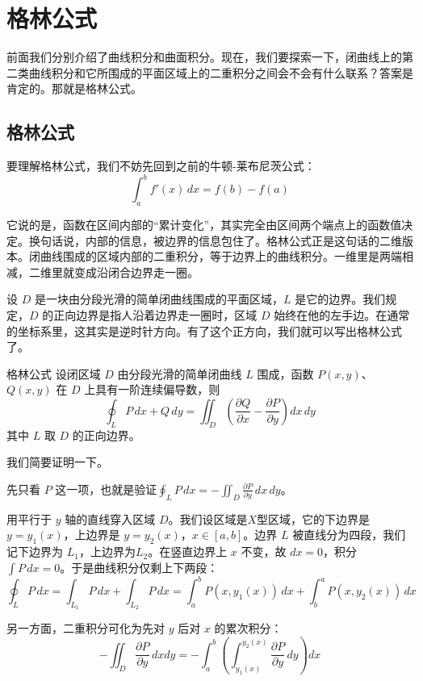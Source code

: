 \section{格林公式}

前面我们分别介绍了曲线积分和曲面积分。现在，我们要探索一下，闭曲线上的第二类曲线积分和它所围成的平面区域上的二重积分之间会不会有什么联系？答案是肯定的。那就是格林公式。

\subsection{格林公式}

要理解格林公式，我们不妨先回到之前的牛顿-莱布尼茨公式：
\[
\int_a^b f'(x)\,dx = f(b) - f(a)
\]

它说的是，函数在区间内部的“累计变化”，其实完全由区间两个端点上的函数值决定。换句话说，内部的信息，被边界的信息包住了。格林公式正是这句话的二维版本。闭曲线围成的区域内部的二重积分，等于边界上的曲线积分。一维里是两端相减，二维里就变成沿闭合边界走一圈。

设 \(D\) 是一块由分段光滑的简单闭曲线围成的平面区域，\(L\) 是它的边界。我们规定，\(D\) 的正向边界是指人沿着边界走一圈时，区域 \(D\) 始终在他的左手边。在通常的坐标系里，这其实是逆时针方向。有了这个正方向，我们就可以写出格林公式了。

\begin{theorem}{格林公式}{}
设闭区域 \(D\) 由分段光滑的简单闭曲线 \(L\) 围成，函数 \(P(x,y)\)、\(Q(x,y)\) 在 \(D\) 上具有一阶连续偏导数，则
\[
\oint_L P\,dx + Q\,dy = \iint_D \left(\frac{\partial Q}{\partial x} - \frac{\partial P}{\partial y}\right) dx\,dy
\]
其中 \(L\) 取 \(D\) 的正向边界。
\end{theorem}

我们简要证明一下。

先只看 \(P\) 这一项，也就是验证\(\oint_L P\,dx = -\iint_D \frac{\partial P}{\partial y}\,dx\,dy\)。

用平行于 \(y\) 轴的直线穿入区域 \(D\)。我们设区域是\(X\)型区域，它的下边界是 \(y=y_1(x)\)，上边界是 \(y=y_2(x)\)，$x\in[a,b]$。边界 $L$ 被直线分为四段，我们记下边界为 $L_1$，上边界为$L_2$。在竖直边界上 $x$ 不变，故 $dx=0$，积分 $\int P\,dx=0$。于是曲线积分仅剩上下两段：
\[\oint_L P\,dx = \int_{L_1} P\,dx + \int_{L_2} P\,dx
= \int_a^b P(x,y_1(x))\,dx + \int_b^a P(x,y_2(x))\,dx\]

另一方面，二重积分可化为先对 $y$ 后对 $x$ 的累次积分：
\[
-\iint_D \frac{\partial P}{\partial y}\,dxdy
= -\int_a^b \left( \int_{y_1(x)}^{y_2(x)} \frac{\partial P}{\partial y}\,dy \right)dx
\]

